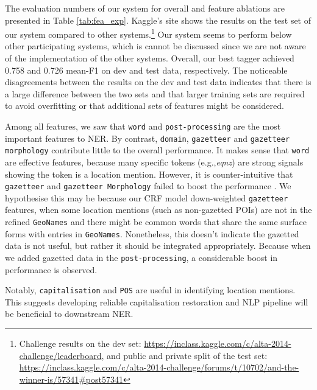 \documentclass[11pt]{article}
\newcommand{\eg}{e.g.,\xspace}
\newcommand{\geoname}{\texttt{GeoNames}\xspace}
\newcommand{\myex}[1]{\textit{#1}}
\newcommand{\feature}[1]{\texttt{#1}\xspace}
\newcommand{\myurl}[1]{{\footnotesize\url{#1}}}
\newcommand{\tabref}[2][]{Table#1 \ref{#2}}
\begin{document}
The evaluation numbers of our system for overall and feature ablations are presented in \tabref{tab:fea_exp}.
Kaggle's site shows the results on the test set of our system compared to other systems.\footnote{Challenge results on the dev set: \myurl{https://inclass.kaggle.com/c/alta-2014-challenge/leaderboard}, and public and private split of the test set: \myurl{https://inclass.kaggle.com/c/alta-2014-challenge/forums/t/10702/and-the-winner-is/57341#post57341}}
Our system seems to perform below other participating systems, which is cannot be discussed since we are not aware of the implementation of the other systems.
Overall, our best tagger achieved 0.758 and 0.726 mean-F1 on dev and test data, respectively.
The noticeable disagreements between the results on the dev and test data indicates that there is a large difference between the two sets and that larger training sets are required to avoid overfitting or that additional sets of features might be considered.

Among all features, we saw that \feature{word} and \feature{post-processing} are the most important features to NER.
By contrast, \feature{domain}, \feature{gazetteer} and \feature{gazetteer morphology} contribute little to the overall performance.
It makes sense that \feature{word} are effective features, because many specific tokens (\eg \myex{eqnz}) are strong signals showing the token is a location mention.
However, it is counter-intuitive that \feature{gazetteer} and \feature{gazetteer Morphology} failed to boost the performance \cite{conll09rati,acl11liux}.
We hypothesise this may be because our CRF model down-weighted \feature{gazetteer} features, when some location mentions (such as non-gazetted POIs) are not in the refined \geoname and there might be common words that share the same surface forms with entries in \geoname.
Nonetheless, this doesn't indicate the gazetted data is not useful, but rather it should be integrated appropriately.
Because when we added gazetted data in the \feature{post-processing}, a considerable boost in performance is observed.

Notably, \feature{capitalisation} and \feature{POS} are useful in identifying location mentions.
This suggests developing reliable capitalisation restoration and NLP pipeline will be beneficial to downstream NER.
\end{document}
